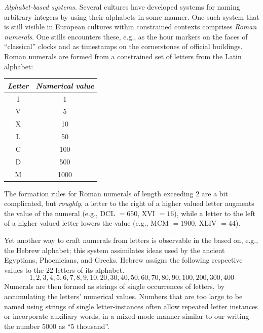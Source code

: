 \medskip

\noindent
{\it Alphabet-based systems.}
%
Several cultures have developed systems for naming arbitrary integers
by using their alphabets in some manner.  One such system that is
still visible in European cultures within constrained contexts
comprises {\it Roman numerals}.  One stills
encounters these, e.g., as the hour markers on the faces of
``classical'' clocks and as timestamps on the cornerstones of official
buildings.  Roman numerals are formed from a constrained set of
letters from the Latin alphabet:

\begin{tabular}{c|c}
{\it Letter} & {\it Numerical value} \\
\hline
I  & 1 \\
V  & 5 \\
X  & 10 \\
L  & 50 \\
C  & 100 \\
D  & 500 \\
M  & 1000
\end{tabular}

\noindent
The formation rules for Roman numerals of length exceeding $2$ are a
bit complicated, but {\em roughly}, a letter to the right of a higher
valued letter augments the value of the numeral (e.g., DCL $=650$, XVI
$=16$), while a letter to the left of a higher valued letter lowers
the value (e.g., MCM $=1900$, XLIV $=44$).

Yet another way to craft numerals from letters is observable in the
based on, e.g., the Hebrew alphabet;  this
system assimilates ideas used by the ancient Egyptians, Phoenicians,
and Greeks.  Hebrew assigns the following respective values to the
$22$ letters of its alphabet.
\[ 1, 2, 3, 4, 5, 6, 7, 8, 9, 10,
20, 30, 40, 50, 60, 70, 80, 90, 100,
 200, 300, 400
\]
Numerals are then formed as strings of single occurrences of letters,
by accumulating the letters' numerical values.  Numbers that are too
large to be named using strings of single letter-instances often allow
repeated letter instances or incorporate auxiliary words, in a
mixed-mode manner similar to our writing the number $5000$ as ``$5$
thousand''.  


